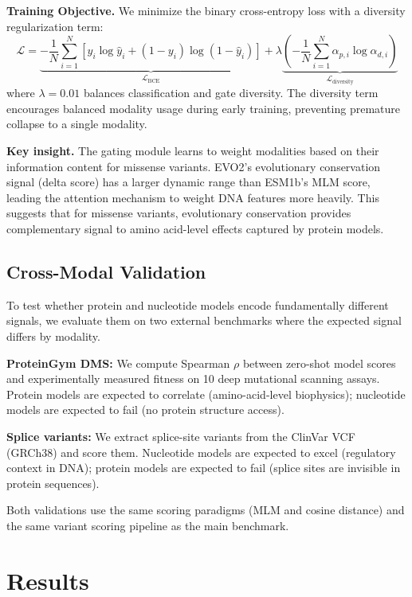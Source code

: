 \documentclass[9pt]{article}
\begin{document}
\textbf{Training Objective.} We minimize the binary cross-entropy loss with a diversity regularization term:
\begin{equation}
    \mathcal{L} = \underbrace{-\frac{1}{N}\sum_{i=1}^{N} [y_i \log \hat{y}_i + (1-y_i)\log(1-\hat{y}_i)]}_{\mathcal{L}_{\text{BCE}}} + \lambda \underbrace{\left(-\frac{1}{N}\sum_{i=1}^{N} \alpha_{p,i} \log \alpha_{d,i}\right)}_{\mathcal{L}_{\text{diversity}}}
    \label{eq:loss}
\end{equation}
where $\lambda = 0.01$ balances classification and gate diversity. The diversity term encourages balanced modality usage during early training, preventing premature collapse to a single modality.

\textbf{Key insight.} The gating module learns to weight modalities based on their information content for missense variants. EVO2's evolutionary conservation signal (delta score) has a larger dynamic range than ESM1b's MLM score, leading the attention mechanism to weight DNA features more heavily. This suggests that for missense variants, evolutionary conservation provides complementary signal to amino acid-level effects captured by protein models.

\subsection{Cross-Modal Validation}

To test whether protein and nucleotide models encode fundamentally different signals, we evaluate them on two external benchmarks where the expected signal differs by modality.

\textbf{ProteinGym DMS:} We compute Spearman $\rho$ between zero-shot model scores and experimentally measured fitness on 10 deep mutational scanning assays. Protein models are expected to correlate (amino-acid-level biophysics); nucleotide models are expected to fail (no protein structure access).

\textbf{Splice variants:} We extract splice-site variants from the ClinVar VCF (GRCh38) and score them. Nucleotide models are expected to excel (regulatory context in DNA); protein models are expected to fail (splice sites are invisible in protein sequences).

Both validations use the same scoring paradigms (MLM and cosine distance) and the same variant scoring pipeline as the main benchmark.

\section{Results}
\end{document}

